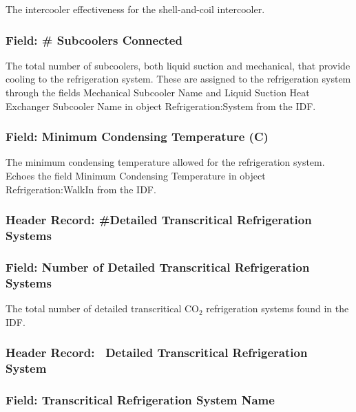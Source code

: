 The intercooler effectiveness for the shell-and-coil intercooler.

\subsubsection{Field: \# Subcoolers Connected}\label{field-subcoolers-connected}

The total number of subcoolers, both liquid suction and mechanical, that provide cooling to the refrigeration system. These are assigned to the refrigeration system through the fields Mechanical Subcooler Name and Liquid Suction Heat Exchanger Subcooler Name in object Refrigeration:System from the IDF.

\subsubsection{Field: Minimum Condensing Temperature (C)}\label{field-minimum-condensing-temperature-c}

The minimum condensing temperature allowed for the refrigeration system. Echoes the field Minimum Condensing Temperature in object Refrigeration:WalkIn from the IDF.

\subsubsection{Header Record: \#Detailed Transcritical Refrigeration Systems}\label{header-record-detailed-transcritical-refrigeration-systems}

\subsubsection{Field: Number of Detailed Transcritical Refrigeration Systems}\label{field-number-of-detailed-transcritical-refrigeration-systems}

The total number of detailed transcritical CO\(_{2}\) refrigeration systems found in the IDF.

\subsubsection{Header Record:~ Detailed Transcritical Refrigeration System}\label{header-record-detailed-transcritical-refrigeration-system}

\subsubsection{Field: Transcritical Refrigeration System Name}\label{field-transcritical-refrigeration-system-name}

